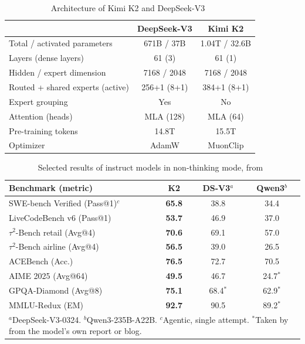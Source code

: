 \documentclass[conference]{IEEEtran}
\begin{document}
\begin{table}[t]
\centering
\caption{Architecture of Kimi K2 and DeepSeek-V3~\cite{kimik2,kimik2github,deepseekv3}}
\label{tab:spec}
\begin{tabular}{lcc}
\toprule
 & DeepSeek-V3 & Kimi K2 \\
\midrule
Total / activated parameters & 671B / 37B & 1.04T / 32.6B \\
Layers (dense layers) & 61 (3) & 61 (1) \\
Hidden / expert dimension & 7168 / 2048 & 7168 / 2048 \\
Routed + shared experts (active) & 256+1 (8+1) & 384+1 (8+1) \\
Expert grouping & Yes & No \\
Attention (heads) & MLA (128) & MLA (64) \\
Pre-training tokens & 14.8T & 15.5T \\
Optimizer & AdamW & MuonClip \\
\bottomrule
\end{tabular}
\end{table}

\begin{table}[t]
\centering
\caption{Selected results of instruct models in non-thinking mode, from~\cite[Table~3]{kimik2}}
\label{tab:bench}
\setlength{\tabcolsep}{4pt}
\begin{tabular}{lccc}
\toprule
Benchmark (metric) & K2 & DS-V3$^{a}$ & Qwen3$^{b}$ \\
\midrule
SWE-bench Verified (Pass@1)$^{c}$ & \textbf{65.8} & 38.8 & 34.4 \\
LiveCodeBench v6 (Pass@1) & \textbf{53.7} & 46.9 & 37.0 \\
$\tau^2$-Bench retail (Avg@4) & \textbf{70.6} & 69.1 & 57.0 \\
$\tau^2$-Bench airline (Avg@4) & \textbf{56.5} & 39.0 & 26.5 \\
ACEBench (Acc.) & \textbf{76.5} & 72.7 & 70.5 \\
AIME 2025 (Avg@64) & \textbf{49.5} & 46.7 & 24.7$^{*}$ \\
GPQA-Diamond (Avg@8) & \textbf{75.1} & 68.4$^{*}$ & 62.9$^{*}$ \\
MMLU-Redux (EM) & \textbf{92.7} & 90.5 & 89.2$^{*}$ \\
\bottomrule
\multicolumn{4}{p{0.95\columnwidth}}{\footnotesize $^{a}$DeepSeek-V3-0324. $^{b}$Qwen3-235B-A22B. $^{c}$Agentic, single attempt. $^{*}$Taken by~\cite{kimik2} from the model's own report or blog.}
\end{tabular}
\end{table}
\end{document}
